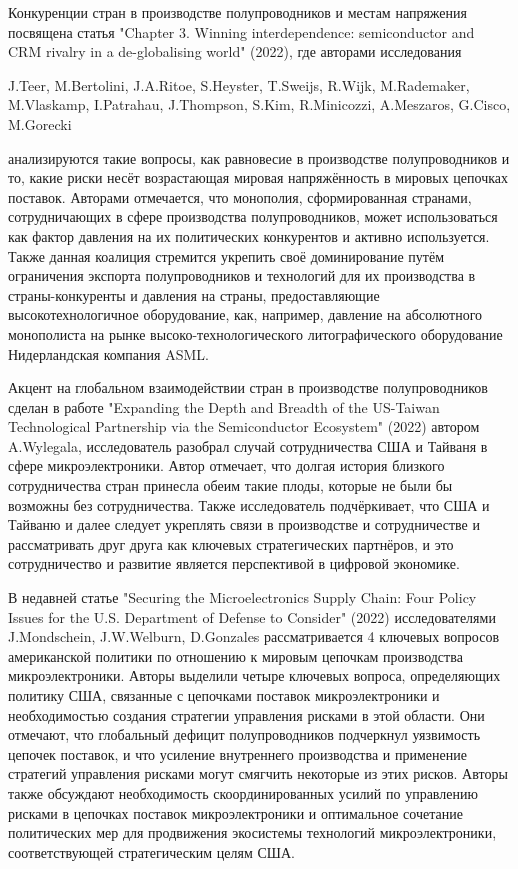 \documentclass[14pt, a4paper]{extarticle}
\begin{document}
Конкуренции стран в производстве полупроводников и местам напряжения посвящена статья "Chapter 3. Winning interdependence: semiconductor and CRM rivalry in a de-globalising world" (2022), где авторами исследования \begin{english} J.Teer, M.Bertolini, J.A.Ritoe, S.Heyster, T.Sweijs, R.Wijk, M.Rademaker, M.Vlaskamp, I.Patrahau, J.Thompson, S.Kim, R.Minicozzi, A.Meszaros, G.Cisco, M.Gorecki\end{english} анализируются такие вопросы, как равновесие в производстве полупроводников и то, какие риски несёт возрастающая мировая напряжённость в мировых цепочках поставок. Авторами отмечается, что монополия, сформированная странами, сотрудничающих в сфере производства полупроводников, может использоваться как фактор давления на их политических конкурентов и активно используется. Также данная коалиция стремится укрепить своё доминирование путём ограничения экспорта полупроводников и технологий для их производства в страны-конкуренты и давления на страны, предоставляющие высокотехнологичное оборудование, как, например, давление на абсолютного монополиста на рынке высоко-технологического литографического оборудование Нидерландская компания ASML.

Акцент на глобальном взаимодействии стран в производстве полупроводников сделан в работе "Expanding the Depth and Breadth of the US-Taiwan Technological Partnership via the Semiconductor Ecosystem" (2022) автором A.Wylegala, исследователь разобрал случай сотрудничества США и Тайваня в сфере микроэлектроники. Автор отмечает, что долгая история близкого сотрудничества стран принесла обеим такие плоды, которые не были бы возможны без сотрудничества. Также исследователь подчёркивает, что США и Тайваню и далее следует укреплять связи в производстве и сотрудничестве и рассматривать друг друга как ключевых стратегических партнёров, и это сотрудничество и развитие является перспективой в цифровой экономике.

В недавней статье "Securing the Microelectronics Supply Chain: Four Policy Issues for the U.S. Department of Defense to Consider" (2022) исследователями J.Mondschein, J.W.Welburn, D.Gonzales  рассматривается 4 ключевых вопросов американской политики по отношению к мировым цепочкам производства микроэлектроники. Авторы выделили четыре ключевых вопроса, определяющих политику США, связанные с цепочками поставок микроэлектроники и необходимостью создания стратегии управления рисками в этой области. Они отмечают, что глобальный дефицит полупроводников подчеркнул уязвимость цепочек поставок, и что усиление внутреннего производства и применение стратегий управления рисками могут смягчить некоторые из этих рисков. Авторы также обсуждают необходимость скоординированных усилий по управлению рисками в цепочках поставок микроэлектроники и оптимальное сочетание политических мер для продвижения экосистемы технологий микроэлектроники, соответствующей стратегическим целям США.
\end{document}
